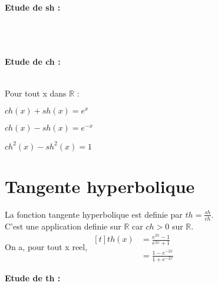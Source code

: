 \documentclass[12pt,twoside,a4paper]{article}
\begin{document}
			\textbf{Etude de sh :}\\ \ \\
			\\ \ \\
			\textbf{Etude de ch :}\\ \ \\
			\begin{prop}
				Pour tout x dans $\mathbb{R}$ :
				\begin{liste}
					\item $ch\left(x\right)+sh\left(x\right)=e^x$
					\item $ch\left(x\right)-sh\left(x\right)=e^{-x}$
					\item $ch^2\left(x\right)-sh^2\left(x\right)=1$
				\end{liste}
			\end{prop}\newpage
	
	\section{Tangente hyperbolique}
		\begin{defi}
			La fonction tangente hyperbolique est definie par $th=\frac{sh}{ch}$.\\
			C'est une application definie sur $\mathbb{R}$ car $ch>0$ sur $\mathbb{R}$.\\
			On a, pour tout x reel, $\begin{aligned}[t]th\left(x\right)&=\frac{e^{2x}-1}{e^{2x}+1}\\
																		 &=\frac{1-e^{-2x}}{1+e^{-2x}}\end{aligned}$
		\end{defi}
		\textbf{Etude de th :}\\ \ \\
	
\end{document}

